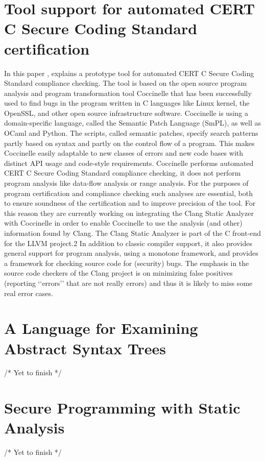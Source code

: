 \section{Tool support for automated CERT C Secure Coding Standard certification }

 In this paper \cite{olesen2010clang}, explains a  prototype tool for automated CERT C Secure Coding Standard compliance checking. The tool
 is based on the open source program analysis and program transformation tool Coccinelle that has been successfully used to find bugs in the program written in C languages like Linux kernel, the OpenSSL, and other open source infrastructure software. Coccinelle is using a domain-specific language, called the Semantic Patch Language (SmPL), as well as OCaml and Python. The scripts, called semantic patches, specify search patterns partly based on syntax and partly on the control flow of a program. This makes Coccinelle easily adaptable to new classes of errors and new code bases with distinct API usage and code-style requirements. Coccinelle performs automated CERT C Secure Coding Standard compliance checking, it does not perform program analysis like data-flow analysis or range analysis.
 For the purposes of program certification and compliance checking such analyses are essential, both to ensure soundness of the certification and to improve precision of the tool. For this reason they are currently working on integrating the Clang Static Analyzer with Coccinelle in order to enable Coccinelle to use the analysis (and other) information found by Clang. The Clang Static Analyzer is part of the C front-end for the LLVM project.2 In addition to classic compiler support, it also provides general support for program analysis, using a monotone framework, and provides a framework for checking source code for (security) bugs. The emphasis in the source code checkers of the Clang project is on minimizing false positives (reporting ‘‘errors’’ that are not really errors) and thus it is likely to miss some real error cases.
 
\section{A Language for Examining Abstract Syntax Trees}
/* Yet to finish */
 \section{Secure Programming with Static Analysis}
 /* Yet to finish */
